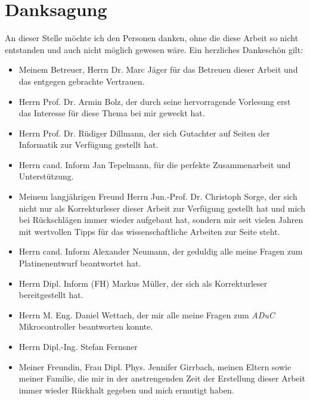 \chapter*{Danksagung}
An dieser Stelle möchte ich den Personen danken, ohne die diese Arbeit so nicht entstanden und auch 
nicht möglich gewesen wäre. Ein herzliches Dankeschön gilt:
\begin{itemize}
\item Meinem Betreuer, Herrn Dr. Marc Jäger für das Betreuen dieser Arbeit und das entgegen
      gebrachte Vertrauen.
\item Herrn Prof. Dr. Armin Bolz, der durch seine hervorragende Vorlesung erst das Interesse für diese
      Thema bei mir geweckt hat.
\item Herrn Prof. Dr. Rüdiger Dillmann, der sich Gutachter auf Seiten der Informatik zur Verfügung gestellt hat.
\item Herrn cand. Inform Jan Tepelmann, für die perfekte Zusammenarbeit und Unterstützung.
\item Meinem langjährigen Freund Herrn Jun.-Prof. Dr. Christoph Sorge, der sich nicht nur als Korrekturleser
      dieser Arbeit zur Verfügung gestellt hat und mich bei Rückschlägen immer wieder aufgebaut hat, 
      sondern mir seit vielen Jahren mit wertvollen Tipps für das wissenschaftliche Arbeiten zur Seite steht. 
\item Herrn cand. Inform Alexander Neumann, der geduldig alle meine Fragen zum Platinenentwurf beantwortet hat.
\item Herrn Dipl. Inform (FH) Markus Müller, der sich als Korrekturleser bereitgestellt hat.
\item Herrn M. Eng. Daniel Wettach, der mir alle meine Fragen zum \emph{ADuC} Mikrocontroller beantworten konnte.
\item Herrn Dipl.-Ing. Stefan Fernsner
\item Meiner Freundin, Frau Dipl. Phys. Jennifer Girrbach, meinen Eltern sowie meiner Familie, die mir in der anstrengenden
      Zeit der Erstellung dieser Arbeit immer wieder Rückhalt gegeben und mich ermutigt haben.
      
\end{itemize}
